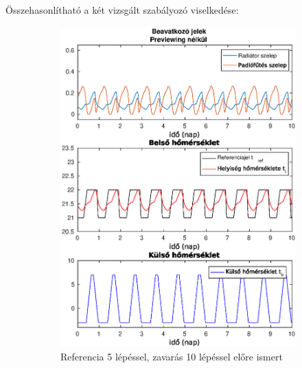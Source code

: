 Összehasonlítható a két vizsgált szabályozó viselkedése:

\begin{figure}[H]
	\begin{subfigure}[t]{0.49\textwidth}
		\centering
		\includegraphics[trim=0 0 0 0, clip,width=\textwidth]{figures/onlab/compare/A_C_P5D10}
		\caption{Referencia 5 lépéssel, zavarás 10 lépéssel előre ismert}
		\label{fig:mpc-c-p5d10}
	\end{subfigure}
	~
	\begin{subfigure}[t]{0.49\textwidth}
		\centering

\end{subfigure}
\end{figure}
